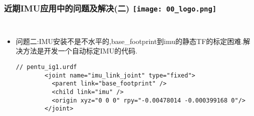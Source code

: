 \begin{frame}[fragile]
  \frametitle{近期IMU应用中的问题及解决(二) \hfill \texttt{[image: 00\_logo.png]}}
  \begin{columns}
    
    \begin{itemize}
      \item 问题二:IMU安装不是不水平的,base\_footprint到imu的静态TF的标定困难.解决方法是开发一个自动标定IMU的代码.

      
      \begin{lstlisting}[frame=shadowbox]  
        // pentu_ig1.urdf
        <joint name="imu_link_joint" type="fixed">
          <parent link="base_footprint" />
          <child link="imu" />
          <origin xyz="0 0 0" rpy="-0.00478014 -0.000399168 0"/>
        </joint>

      \end{lstlisting}

    \end{itemize}
    

  
  \end{columns}
  \end{frame}   


